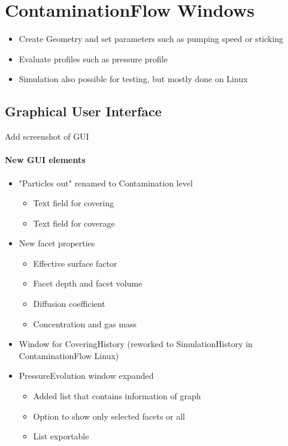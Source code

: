 
\chapter{ContaminationFlow Windows}\label{chapter:Windows}

\begin{itemize}[noitemsep,topsep=0pt]
\item Create Geometry and set parameters such as pumping speed or sticking
\item Evaluate profiles such as pressure profile
\item Simulation also possible for testing, but mostly done on Linux
\end{itemize}

\section{Graphical User Interface}
Add screenshot of GUI

\subsubsection{New GUI elements}
\begin{itemize}[noitemsep,topsep=0pt]
\item "Particles out" renamed to Contamination level
\begin{itemize}[noitemsep,topsep=0pt]
\item Text field for covering
\item Text field for coverage
\end{itemize}
\item New facet properties
\begin{itemize}[noitemsep,topsep=0pt]
\item Effective surface factor
\item Facet depth and facet volume
\item Diffusion coefficient
\item Concentration and gas mass
\end{itemize}
\item Window for CoveringHistory (reworked to SimulationHistory in ContaminationFlow Linux)
\item PressureEvolution window expanded
	\begin{itemize}[noitemsep,topsep=0pt]
	\item Added list that contains information of graph
	\item Option to show only selected facets or all
	\item List exportable
	\end{itemize}
\end{itemize}

